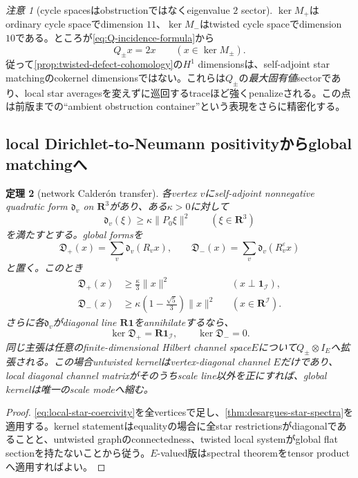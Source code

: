 \documentclass[11pt,a4paper]{ltjsarticle}
\newtheorem{theorem}{定理}[section]
\theoremstyle{definition}
\theoremstyle{remark}
\newtheorem{remark}[theorem]{注意}
\newcommand{\RR}{\mathbf R}
\newcommand{\one}{\mathbf 1}
\begin{document}
\begin{remark}[cycle spacesはobstructionではなくeigenvalue $2$ sector]\label{rem:H1-is-maximal-energy}
$\ker M_+$はordinary cycle spaceでdimension $11$、$\ker M_-$はtwisted cycle spaceでdimension $10$である。ところが\eqref{eq:Q-incidence-formula}から
\[
 Q_\pm x=2x\qquad(x\in\ker M_\pm).
\]
従って\cref{prop:twisted-defect-cohomology}の$H^1$ dimensionsは、self-adjoint star matchingのcokernel dimensionsではない。これらは$Q_\pm$の\emph{最大固有値}sectorであり、local star averagesを変えずに巡回するtraceほど強くpenalizeされる。この点は前版までの``ambient obstruction container''という表現をさらに精密化する。
\end{remark}

\subsection{local Dirichlet-to-Neumann positivityからglobal matchingへ}

\begin{theorem}[network Calder\'on transfer]\label{thm:network-calderon-transfer}
各vertex $v$にself-adjoint nonnegative quadratic form
$\mathfrak d_v$ on $\RR^3$があり、ある$\kappa>0$に対して
\begin{equation}\label{eq:local-star-coercivity}
 \mathfrak d_v(\xi)\ge\kappa\|P_0\xi\|^2
 \qquad(\xi\in\RR^3)
\end{equation}
を満たすとする。global formsを
\[
 \mathfrak D_+(x)=\sum_v\mathfrak d_v(R_vx),
 \qquad
 \mathfrak D_-(x)=\sum_v\mathfrak d_v(R_v^\varepsilon x)
\]
と置く。このとき
\begin{align}
 \mathfrak D_+(x)&\ge\frac\kappa3\|x\|^2
 &&(x\perp\one_{\mathcal I}),\label{eq:global-even-gap}\\
 \mathfrak D_-(x)&\ge
 \kappa\left(1-\frac{\sqrt5}{3}\right)\|x\|^2
 &&(x\in\RR^{\mathcal I}).\label{eq:global-odd-gap}
\end{align}
さらに各$\mathfrak d_v$がdiagonal line $\RR\one$をannihilateするなら、
\[
 \ker\mathfrak D_+=\RR\one_{\mathcal I},
 \qquad
 \ker\mathfrak D_-=0.
\]
同じ主張は任意のfinite-dimensional Hilbert channel space$E$について$Q_\pm\otimes I_E$へ拡張される。この場合untwisted kernelはvertex-diagonal channel $E$だけであり、local diagonal channel matrixがそのうちscale line以外を正にすれば、global kernelは唯一のscale modeへ縮む。
\end{theorem}

\begin{proof}
\eqref{eq:local-star-coercivity}を全verticesで足し、\cref{thm:desargues-star-spectra}を適用する。kernel statementはequalityの場合に全star restrictionsがdiagonalであることと、untwisted graphのconnectedness、twisted local systemがglobal flat sectionを持たないことから従う。$E$-valued版はspectral theoremをtensor productへ適用すればよい。
\end{proof}
\end{document}
